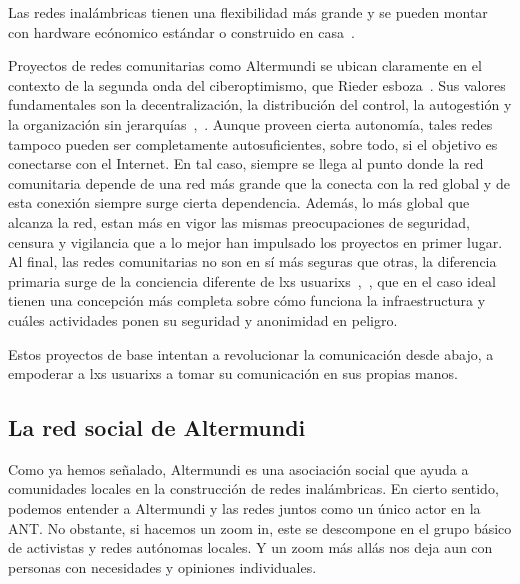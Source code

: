 Las redes inalámbricas tienen una flexibilidad más grande y se pueden montar con hardware ecónomico estándar o construido en casa~\autocite{Piccoli2015}.

Proyectos de redes comunitarias como Altermundi se ubican claramente en el contexto de la segunda onda del ciberoptimismo, que Rieder esboza~\autocite{Rieder2012}.
Sus valores fundamentales son la decentralización, la distribución del control, la autogestión y la organización sin jerarquías~\autocite{FiTre2015},~\autocite{Piccoli2015}.
Aunque proveen cierta autonomía, tales redes tampoco pueden ser completamente autosuficientes, sobre todo, si el objetivo es conectarse con el Internet.
En tal caso, siempre se llega al punto donde la red comunitaria depende de una red más grande que la conecta con la red global y de esta conexión siempre surge cierta dependencia.
Además, lo más global que alcanza la red, estan más en vigor las mismas preocupaciones de seguridad, censura y vigilancia que a lo mejor han impulsado los proyectos en primer lugar.
Al final, las redes comunitarias no son en sí más seguras que otras, la diferencia primaria surge de la conciencia diferente de lxs usuarixs~\autocite{Piccoli2015},~\autocite{FiTre2015}, que en el caso ideal tienen una concepción más completa sobre cómo funciona la infraestructura y cuáles actividades ponen su seguridad y anonimidad en peligro.

Estos proyectos de base intentan a revolucionar la comunicación desde abajo, a empoderar a lxs usuarixs a tomar su comunicación en sus propias manos. %

\subsection{La red social de Altermundi}

Como ya hemos señalado, Altermundi es una asociación social que ayuda a comunidades locales en la construcción de redes inalámbricas.
En cierto sentido, podemos entender a Altermundi y las redes juntos como un único actor en la ANT.
No obstante, si hacemos un zoom in, este se descompone en el grupo básico de activistas y redes autónomas locales.
Y un zoom más allás nos deja aun con personas con necesidades y opiniones individuales.


